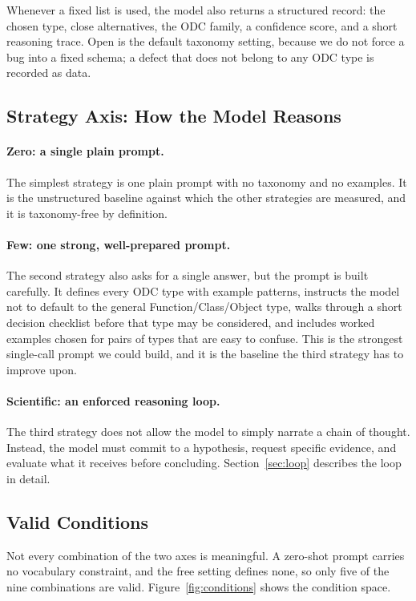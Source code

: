 \documentclass{iutbscthesis}
\begin{document}
Whenever a fixed list is used, the model also returns a structured record: the chosen type, close alternatives, the ODC family, a confidence score, and a short reasoning trace. Open is the default taxonomy setting, because we do not force a bug into a fixed schema; a defect that does not belong to any ODC type is recorded as data.

\subsection{Strategy Axis: How the Model Reasons}

\paragraph{Zero: a single plain prompt.} The simplest strategy is one plain prompt with no taxonomy and no examples. It is the unstructured baseline against which the other strategies are measured, and it is taxonomy-free by definition.

\paragraph{Few: one strong, well-prepared prompt.} The second strategy also asks for a single answer, but the prompt is built carefully. It defines every ODC type with example patterns, instructs the model not to default to the general Function/\allowbreak Class/\allowbreak Object type, walks through a short decision checklist before that type may be considered, and includes worked examples chosen for pairs of types that are easy to confuse. This is the strongest single-call prompt we could build, and it is the baseline the third strategy has to improve upon.

\paragraph{Scientific: an enforced reasoning loop.} The third strategy does not allow the model to simply narrate a chain of thought. Instead, the model must commit to a hypothesis, request specific evidence, and evaluate what it receives before concluding. Section~\ref{sec:loop} describes the loop in detail.

\subsection{Valid Conditions}

Not every combination of the two axes is meaningful. A zero-shot prompt carries no vocabulary constraint, and the free setting defines none, so only five of the nine combinations are valid. Figure~\ref{fig:conditions} shows the condition space.
\end{document}
